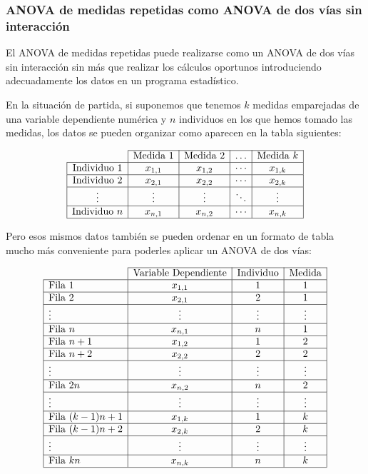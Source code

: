 \subsubsection{ANOVA de medidas repetidas como ANOVA de dos vías sin interacción}
El ANOVA de medidas repetidas puede realizarse como un ANOVA de dos vías sin interacción sin más que realizar los
cálculos oportunos introduciendo adecuadamente los datos en un programa estadístico.

En la situación de partida, si suponemos que tenemos $k$ medidas emparejadas de una variable dependiente numérica y $n$
individuos en los que hemos tomado las medidas, los datos se pueden organizar como aparecen en la tabla siguientes:

\[
\begin{array}{|c|c|c|c|c|}
\cline{2-5}
\multicolumn{1}{c|}{} & \text{Medida 1} & \text{Medida 2} & \ldots & \text{Medida $k$} \\
\hline
\text{Individuo 1} & x_{1,1} & x_{1,2} & \cdots & x_{1,k} \\
\hline
\text{Individuo 2} & x_{2,1} & x_{2,2} & \cdots & x_{2,k} \\
\hline
\vdots & \vdots & \vdots & \ddots & \vdots\\
\hline
\text{Individuo $n$} & x_{n,1} & x_{n,2} & \cdots & x_{n,k} \\
\hline
\end{array}
\]

Pero esos mismos datos también se pueden ordenar en un formato de tabla mucho más conveniente para poderles aplicar un
ANOVA de dos vías:

\[
\begin{array}{|l|c|c|c|}
\cline{2-4}
\multicolumn{1}{c|}{} & \text{Variable Dependiente} & \text{Individuo} & \text{Medida} \\
\hline
\text{Fila 1} & x_{1,1} & 1 & 1 \\
\hline
\text{Fila 2} & x_{2,1} & 2 & 1 \\
\hline
\vdots & \vdots & \vdots & \vdots \\
\hline
\text{Fila $n$} & x_{n,1} & n & 1 \\
\hline
\text{Fila $n+1$} & x_{1,2} & 1 & 2 \\
\hline
\text{Fila $n+2$} & x_{2,2} & 2 & 2 \\
\hline
\vdots & \vdots & \vdots & \vdots \\
\hline
\text{Fila $2n$} & x_{n,2} & n & 2 \\
\hline
\vdots & \vdots & \vdots & \vdots \\
\hline
\text{Fila $(k-1)n+1$} & x_{1,k} & 1 & k \\
\hline
\text{Fila $(k-1)n+2$} & x_{2,k} & 2 & k \\
\hline
\vdots & \vdots & \vdots & \vdots \\
\hline
\text{Fila $kn$} & x_{n,k} & n & k \\
\hline
\end{array}
\]

